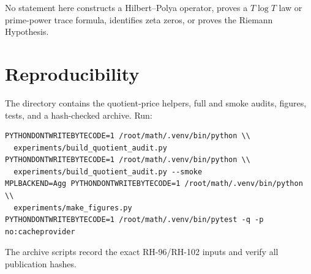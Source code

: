 \documentclass[11pt]{article}
\theoremstyle{definition}
\theoremstyle{remark}
\begin{document}
No statement here constructs a Hilbert--Polya operator, proves a $T\log T$
law or prime-power trace formula, identifies zeta zeros, or proves the
Riemann Hypothesis.

\section{Reproducibility}

The directory contains the quotient-price helpers, full and smoke audits,
figures, tests, and a hash-checked archive.  Run:
\begin{verbatim}
PYTHONDONTWRITEBYTECODE=1 /root/math/.venv/bin/python \\
  experiments/build_quotient_audit.py
PYTHONDONTWRITEBYTECODE=1 /root/math/.venv/bin/python \\
  experiments/build_quotient_audit.py --smoke
MPLBACKEND=Agg PYTHONDONTWRITEBYTECODE=1 /root/math/.venv/bin/python \\
  experiments/make_figures.py
PYTHONDONTWRITEBYTECODE=1 /root/math/.venv/bin/pytest -q -p no:cacheprovider
\end{verbatim}
The archive scripts record the exact RH-96/RH-102 inputs and verify all
publication hashes.



\end{document}

